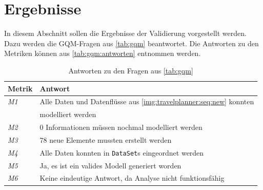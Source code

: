 \section{Ergebnisse}
In diesem Abschnitt sollen die Ergebnisse der Validierung vorgestellt werden. Dazu werden die GQM-Fragen aus \autoref{tab:gqm} beantwortet. Die Antworten zu den Metriken können aus \autoref{tab:gqm:antworten} entnommen werden. 
\begin{table}[h]
\centering
\begin{tabular}{l|l}
\textbf{Metrik} & \textbf{Antwort} \\\hline
\textit{M1} & Alle Daten und Datenflüsse aus \autoref{img:travelplanner:seq:new} konnten \\
 & modelliert werden \\\hline
\textit{M2} & 0 Informationen müssen nochmal modelliert werden  \\\hline 
\textit{M3} & 78 neue Elemente mussten erstellt werden  \\ \hline 
\textit{M4} & Alle Daten konnten in \texttt{DataSet}s eingeordnet werden \\\hline
\textit{M5} & Ja, es ist ein valides Modell generiert worden  \\\hline 
\textit{M6} & Keine eindeutige Antwort, da Analyse nicht funktionsfähig  \\ \hline 
 
\end{tabular}
\caption{\label{tab:gqm:antworten} Antworten zu den Fragen aus \autoref{tab:gqm}}
\end{table}

